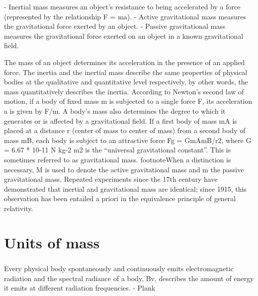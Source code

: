 \documentclass{book}
\begin{document}
	- Inertial mass measures an object's resistance to being accelerated by a force (represented by the relationship F = ma).
	- Active gravitational mass measures the gravitational force exerted by an object.
	- Passive gravitational mass measures the gravitational force exerted on an object in a known gravitational field.
	
	
	The mass of an object determines its acceleration in the presence of an applied force. The inertia and the inertial mass describe the same properties of physical bodies at the qualitative and quantitative level respectively, by other words, the mass quantitatively describes the inertia. According to Newton's second law of motion, if a body of fixed mass m is subjected to a single force F, its acceleration a is given by F/m. A body's mass also determines the degree to which it generates or is affected by a gravitational field. If a first body of mass mA is placed at a distance r (center of mass to center of mass) from a second body of mass mB, each body is subject to an attractive force Fg = GmAmB/r2, where G = 6.67 * 10{-11} N kg{-2} m2 is the ``universal gravitational constant''. This is sometimes referred to as gravitational mass.  footnote{When a distinction is necessary, M is used to denote the active gravitational mass and m the passive gravitational mass.} Repeated experiments since the 17th century have demonstrated that inertial and gravitational mass are identical; since 1915, this observation has been entailed a priori in the equivalence principle of general relativity.
	
	\chapter{Units of mass}
	
	\paragraph{}
	Every physical body spontaneously and continuously emits electromagnetic radiation and the spectral radiance of a body, Bv, describes the amount of energy it emits at different radiation frequencies. - Plank
	
\end{document}
